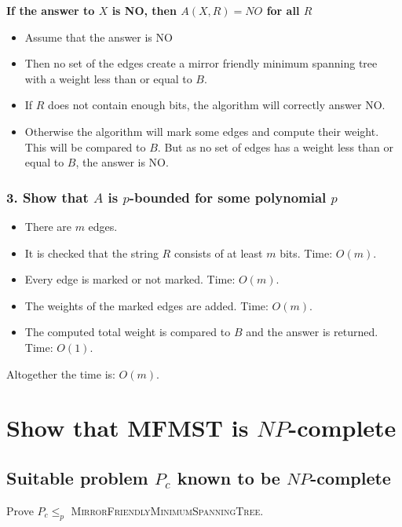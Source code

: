 \documentclass[12pt]{report}
\begin{document}
\textbf{If the answer to $X$ is NO, then $A(X, R) = NO$ for all $R$}
\begin{itemize}
	\item[] Assume that the answer is NO
	
	\item[] Then no set of the edges create a mirror friendly minimum spanning tree with a weight less than or equal to $B$.
	
	\item[] If $R$ does not contain enough bits, the algorithm will correctly answer NO.
	
	\item[] Otherwise the algorithm will mark some edges and compute their weight. This will be compared to $B$. But as no set of edges has a weight less than or equal to $B$, the answer is NO.
\end{itemize}

\subsubsection{3. Show that $A$ is $p$-bounded for some polynomial $p$}
\begin{itemize}
	\item[] There are $m$ edges.
	
	\item[] It is checked that the string $R$ consists of at least $m$ bits. Time: $O(m)$.
	
	\item[] Every edge is marked or not marked. Time: $O(m)$.
	
	\item[] The weights of the marked edges are added. Time: $O(m)$.
	
	\item[] The computed total weight is compared to $B$ and the answer is returned. Time: $O(1)$.
\end{itemize}

Altogether the time is: $O(m)$.

\section{Show that MFMST is $NP$-complete}
\subsection{Suitable problem $P_c$ known to be $NP$-complete}

Prove $P_c \leq_p$ \textsc{MirrorFriendlyMinimumSpanningTree}.
\end{document}
